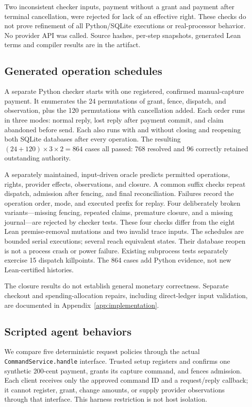 \documentclass[11pt]{article}
\newcommand{\code}[1]{\texttt{\small #1}}
\begin{document}
Two inconsistent checker inputs, payment without a grant and payment after
terminal cancellation, were rejected for lack of an effective right. These
checks do not prove refinement of all Python/SQLite executions or real-processor
behavior. No provider API was called. Source hashes, per-step snapshots,
generated Lean terms and compiler results are in the artifact.

\subsection{Generated operation schedules}
\label{sec:schedules}
A separate Python checker starts with one registered, confirmed manual-capture
payment. It enumerates the 24 permutations of grant, fence, dispatch, and
observation, plus the 120 permutations with cancellation added. Each order runs
in three modes: normal reply, lost reply after payment commit, and claim
abandoned before send. Each also runs with and without closing and reopening
both SQLite databases after every operation. The resulting
$(24+120)\times3\times2=864$ cases all passed: 768 resolved and 96 correctly
retained outstanding authority.

A separately maintained, input-driven oracle predicts permitted operations,
rights, provider effects, observations, and closure. A common suffix checks
repeat dispatch, admission after fencing, and final reconciliation. Failures
record the operation order, mode, and executed prefix for replay. Four deliberately
broken variants---missing fencing, repeated claims, premature closure, and a
missing journal---are rejected by checker tests. These four checks differ from
the eight Lean premise-removal mutations and two invalid trace inputs.
The schedules are bounded serial executions; several reach equivalent states.
Their database reopen is not a process crash or power failure. Existing
subprocess tests separately exercise 15 dispatch killpoints. The 864 cases add
Python evidence, not new Lean-certified histories.

The closure results do not establish general monetary correctness. Separate
checkout and spending-allocation repairs, including direct-ledger
input validation, are documented in Appendix~\ref{app:implementation}.

\subsection{Scripted agent behaviors}
\label{sec:agents}
We compare five deterministic request policies through the actual
\code{CommandService.handle} interface. Trusted setup registers and confirms
one synthetic 200-cent payment, grants its capture command, and fences admission.
Each client receives only the approved command ID and a request/reply callback;
it cannot register, grant, change amounts, or supply provider observations
through that interface. This harness restriction is not host isolation.
\end{document}
